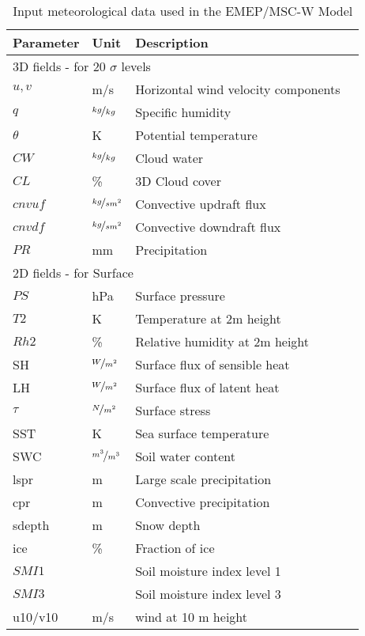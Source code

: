 \begin{table}[h!]
\caption{Input meteorological data used in the EMEP/MSC-W Model
   \label{Tab:metinput}}
\begin{center}
\begin{tabular}{p{6cm}lll}
\hline
Parameter      & Unit & Description          \\
\hline
\multicolumn{3}{l}{3D fields - for 20 $\sigma$ levels} \\
$u,v$  &  m/s     & Horizontal wind velocity components   \\
$q$    &  $\nicefrac{kg}{kg}$   & Specific humidity           \\
$\theta$       & K  & Potential temperature \\
$CW$             & $\nicefrac{kg}{kg}$ & Cloud water          \\
$CL$             & \% & 3D Cloud cover            \\
$cnvuf$          & $\nicefrac{kg}{sm^2}$ & Convective updraft flux \\
$cnvdf$          & $\nicefrac{kg}{sm^2}$ & Convective downdraft flux \\
$PR$             & mm & Precipitation         \\
\hline
\multicolumn{3}{l}{2D fields - for Surface} \\
$PS$             & hPa & Surface pressure                     \\
$T2$          & K  & Temperature at 2m height               \\
$Rh2$             & \% & Relative humidity at 2m height \\
SH              &  $\nicefrac{W}{m^{2}}$ & Surface flux of sensible heat \\
LH             & $\nicefrac{W}{m^{2}}$ & Surface flux of latent heat \\
$\tau$         & $\nicefrac{N}{m^{2}}$ & Surface stress               \\
SST            & K & Sea surface temperature \\
SWC            & $\nicefrac{m^{3}}{m^{3}}$ & Soil water content      \\
lspr             & m & Large scale precipitation \\
cpr              & m & Convective precipitation \\
sdepth         & m & Snow depth \\
ice            & \% & Fraction of ice \\  
$SMI1$           &    & Soil moisture index level 1 \\
$SMI3$           &    & Soil moisture index level 3 \\
u10/v10        & m/s  & wind at 10 m height \\
\hline
\end{tabular}\\
\end{center}
\end{table}

